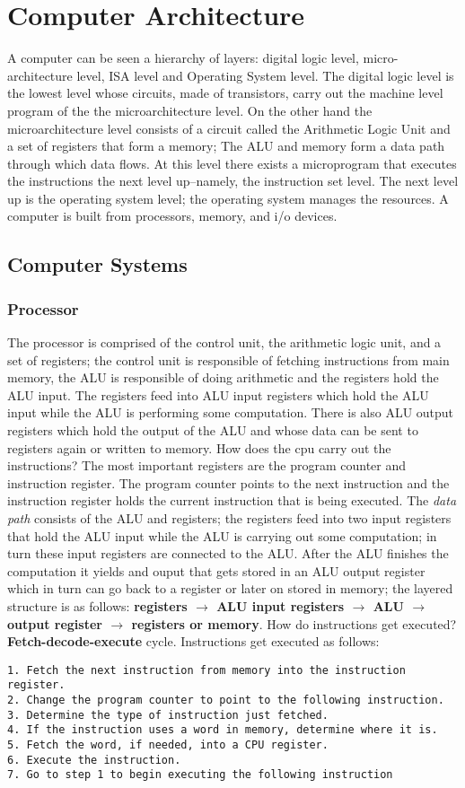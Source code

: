 \documentclass{amsbook}
\begin{document}
\chapter{Computer Architecture}

A computer can be seen a hierarchy of layers: digital logic level, micro-architecture level, ISA level and Operating System level. The digital logic level is the lowest level whose circuits, made of transistors, carry out the machine level program of the the microarchitecture level. On the other hand the microarchitecture level consists of a circuit called the Arithmetic Logic Unit and a set of registers that form a memory; The ALU and memory form a data path through which data flows. At this level there exists a microprogram that executes the instructions the next level up--namely, the instruction set level. The next level up is the operating system level; the operating system manages the resources. A computer is built from processors, memory, and i/o devices.
\section{Computer Systems}
\subsection{Processor}
The processor is comprised of the control unit, the arithmetic logic unit, and a set of registers; the control unit is responsible of fetching instructions from main memory, the ALU is responsible of doing arithmetic and the registers hold the ALU input. The registers feed into ALU input registers which hold the ALU input while the ALU is performing some computation. There is also ALU output registers which hold the output of the ALU and whose data can be sent to registers again or written to memory. How does the cpu carry out the instructions? The most important registers are the program counter and instruction register. The program counter points to the next instruction and the instruction register holds the current instruction that is being executed. The \textit{data path} consists of the ALU and registers; the registers feed into two input registers that hold the ALU input while the ALU is carrying out some computation; in turn these input registers are connected to the ALU. After the ALU finishes the computation it yields and ouput that gets stored in an ALU output register which in turn can go back to a register or later on stored in memory; the layered structure is as follows: \textbf{registers $\rightarrow$ ALU input registers $\rightarrow$ ALU $\rightarrow$ output register $\rightarrow$ registers or memory}. How do instructions get executed? \textbf{Fetch-decode-execute} cycle. Instructions get executed as follows:
\begin{lstlisting}
1. Fetch the next instruction from memory into the instruction register.
2. Change the program counter to point to the following instruction.
3. Determine the type of instruction just fetched.
4. If the instruction uses a word in memory, determine where it is.
5. Fetch the word, if needed, into a CPU register.
6. Execute the instruction.
7. Go to step 1 to begin executing the following instruction
\end{lstlisting}
\end{document}
